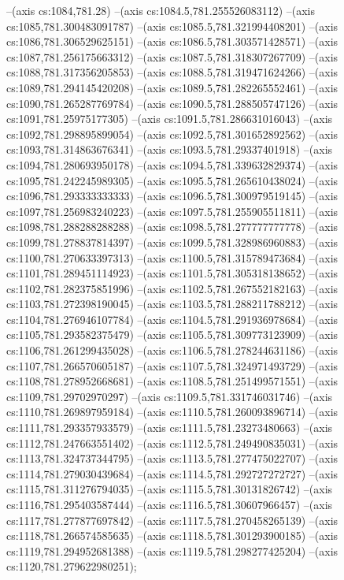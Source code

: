 --(axis cs:1084,781.28)
--(axis cs:1084.5,781.255526083112)
--(axis cs:1085,781.300483091787)
--(axis cs:1085.5,781.321994408201)
--(axis cs:1086,781.306529625151)
--(axis cs:1086.5,781.303571428571)
--(axis cs:1087,781.256175663312)
--(axis cs:1087.5,781.318307267709)
--(axis cs:1088,781.317356205853)
--(axis cs:1088.5,781.319471624266)
--(axis cs:1089,781.294145420208)
--(axis cs:1089.5,781.282265552461)
--(axis cs:1090,781.265287769784)
--(axis cs:1090.5,781.288505747126)
--(axis cs:1091,781.25975177305)
--(axis cs:1091.5,781.286631016043)
--(axis cs:1092,781.298895899054)
--(axis cs:1092.5,781.301652892562)
--(axis cs:1093,781.314863676341)
--(axis cs:1093.5,781.29337401918)
--(axis cs:1094,781.280693950178)
--(axis cs:1094.5,781.339632829374)
--(axis cs:1095,781.242245989305)
--(axis cs:1095.5,781.265610438024)
--(axis cs:1096,781.293333333333)
--(axis cs:1096.5,781.300979519145)
--(axis cs:1097,781.256983240223)
--(axis cs:1097.5,781.255905511811)
--(axis cs:1098,781.288288288288)
--(axis cs:1098.5,781.277777777778)
--(axis cs:1099,781.278837814397)
--(axis cs:1099.5,781.328986960883)
--(axis cs:1100,781.270633397313)
--(axis cs:1100.5,781.315789473684)
--(axis cs:1101,781.289451114923)
--(axis cs:1101.5,781.305318138652)
--(axis cs:1102,781.282375851996)
--(axis cs:1102.5,781.267552182163)
--(axis cs:1103,781.272398190045)
--(axis cs:1103.5,781.288211788212)
--(axis cs:1104,781.276946107784)
--(axis cs:1104.5,781.291936978684)
--(axis cs:1105,781.293582375479)
--(axis cs:1105.5,781.309773123909)
--(axis cs:1106,781.261299435028)
--(axis cs:1106.5,781.278244631186)
--(axis cs:1107,781.266570605187)
--(axis cs:1107.5,781.324971493729)
--(axis cs:1108,781.278952668681)
--(axis cs:1108.5,781.251499571551)
--(axis cs:1109,781.29702970297)
--(axis cs:1109.5,781.331746031746)
--(axis cs:1110,781.269897959184)
--(axis cs:1110.5,781.260093896714)
--(axis cs:1111,781.293357933579)
--(axis cs:1111.5,781.23273480663)
--(axis cs:1112,781.247663551402)
--(axis cs:1112.5,781.249490835031)
--(axis cs:1113,781.324737344795)
--(axis cs:1113.5,781.277475022707)
--(axis cs:1114,781.279030439684)
--(axis cs:1114.5,781.292727272727)
--(axis cs:1115,781.311276794035)
--(axis cs:1115.5,781.30131826742)
--(axis cs:1116,781.295403587444)
--(axis cs:1116.5,781.30607966457)
--(axis cs:1117,781.277877697842)
--(axis cs:1117.5,781.270458265139)
--(axis cs:1118,781.266574585635)
--(axis cs:1118.5,781.301293900185)
--(axis cs:1119,781.294952681388)
--(axis cs:1119.5,781.298277425204)
--(axis cs:1120,781.279622980251);
